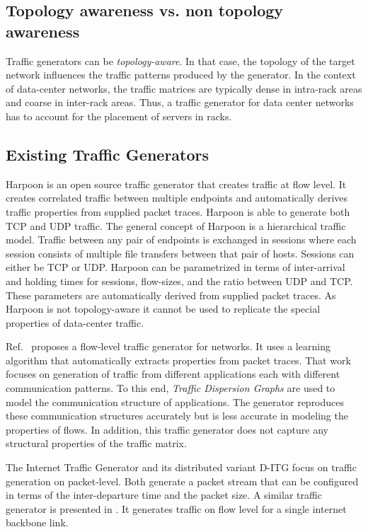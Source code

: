 \documentclass[journal,10pt]{IEEEtran}
\begin{document}
\subsection{Topology awareness vs. non topology awareness}
Traffic generators can be \emph{topology-aware}. 
In that case, the topology of the target network influences the traffic patterns produced by the generator.
In the context of data-center networks, the traffic matrices are typically dense in intra-rack areas and coarse in inter-rack areas.
Thus, a traffic generator for data center networks has to account for the placement of servers in racks.

\subsection{Existing Traffic Generators}
Harpoon \cite{conf/sigmetrics/SommersKB04} is an open source traffic generator that creates traffic at flow level.
It creates correlated traffic between multiple endpoints and automatically derives 
traffic properties from supplied packet traces. Harpoon is able to generate both TCP and UDP traffic. The general concept of Harpoon is a
hierarchical traffic model. 
Traffic between any pair of endpoints is exchanged in sessions where each session consists of multiple file transfers between
that pair of hosts. Sessions can either be TCP or UDP. Harpoon can be parametrized in terms of inter-arrival and holding times for
sessions, flow-sizes, and the ratio between UDP and TCP.
These parameters are automatically derived from supplied packet traces.
As Harpoon is not topology-aware it cannot be used to replicate the special properties of data-center traffic.


Ref.~\cite{Siska:2010:FTG:1815396.1815503} proposes a flow-level traffic generator for networks. It uses a learning algorithm that 
automatically extracts properties from 
packet traces. 
That work focuses on generation of traffic from different applications each with different communication patterns.
To this end, \emph{Traffic Dispersion Graphs} are used to model the communication structure of applications.
The generator reproduces these communication structures accurately but is less accurate in modeling the properties of flows.
In addition, this traffic generator does not capture any structural properties of the traffic matrix.


The Internet Traffic Generator \cite{itg} and its distributed variant D-ITG \cite{d-itg} focus on traffic generation on packet-level.
Both generate a packet stream that can be configured in terms of the inter-departure time and the packet size.
A similar traffic generator is presented in \cite{barakat2003modeling}. It generates traffic on flow level for a single internet backbone link.
\end{document}
